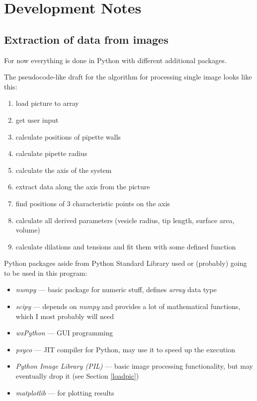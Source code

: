 
\section{Development Notes}
\subsection{Extraction of data from images}\label{data}

For now everything is done in Python with different additional packages.

The pseudocode-like draft for the algorithm for processing single image looks like this:
\begin{enumerate}
  \item load picture to array
  \item get user input
  \item calculate positions of pipette walls
  \item calculate pipette radius
  \item calculate the axis of the system
  \item extract data along the axis from the picture
  \item find positions of 3 characteristic points on the axis
  \item calculate all derived parameters (vesicle radius, tip length, surface area, volume)
  \item calculate dilations and tensions and fit them with some defined function
\end{enumerate}

Python packages aside from Python Standard Library used or (probably) going to be used in this program:
\begin{itemize}
	\item \emph{numpy} --- basic package for numeric stuff, defines \emph{array} data type
	\item \emph{scipy} --- depends on \emph{numpy} and provides a lot of mathematical functions, which I most probably will need \cite{scipy}
	\item \emph{wxPython} --- GUI programming
	\item \emph{psyco} --- JIT compiler for Python, may use it to speed up the execution
	\item \emph{Python Image Library (PIL)} --- basic image processing functionality, but may eventually drop it (see Section \ref{loadpic})
	\item \emph{matplotlib} --- for plotting results
\end{itemize}

